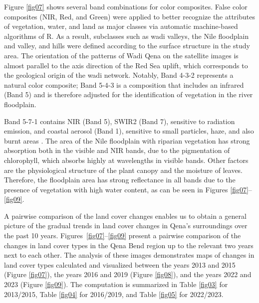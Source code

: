 \documentclass[information,article,accept,pdftex,moreauthors]{Definitions/mdpi}
\begin{document}
Figure \ref{fig07} shows several band combinations for color composites. False color composites (NIR, Red{, }and Green) {were }applied to better {recognize } the attributes of vegetation, water{, }and land as major classes via automatic machine-based algorithms of R. {As a result, } subclasses such as wadi valleys, the Nile floodplain and valley, {and hills }were defined according to the surface structure in the study area. {The } orientation of the patterns of Wadi Qena {on the satellite images is }almost parallel to the axis direction of the Red Sea uplift, which corresponds to the {geological} origin of the wadi network. {Notably}, Band 4-3-2 represents a natural color composite; Band 5-4-3 is a composition that includes an infrared (Band 5) and is therefore adjusted for the identification of vegetation in the river floodplain. 

Band 5-7-1 contains NIR (Band 5), SWIR2 (Band 7), sensitive to radiation emission, and coastal aerosol (Band 1), sensitive to small particles, haze, and also burnt areas \cite{8611806}. The area of the Nile floodplain with riparian vegetation has strong absorption both in the visible and NIR bands, due to the pigmentation of chlorophyll, which absorbs highly at wavelengths in visible bands. Other factors are the physiological structure of the plant canopy and the moisture of leaves. Therefore, the floodplain area has strong reflectance in all bands due to the presence of vegetation with high water content, as can be seen in Figures \ref{fig07}--\ref{fig09}.

A pairwise comparison of the land cover changes enables us to obtain a  general picture of the gradual trends in land cover changes in Qena's surroundings over the past 10 years. \mbox{Figures \ref{fig07}--\ref{fig09}} {present a pairwise comparison of the changes in land cover types in the Qena Bend region up to the relevant two years next to each other. The analysis of these images demonstrates maps of changes in land cover types calculated and visualized between the years 2013 and 2015 (Figure} \ref{fig07}), {the years 2016 and 2019 (Figure} \ref{fig08}), {and the years 2022 and 2023 (Figure} \ref{fig09}). {The computation is summarized in Table} \ref{fig03} {for 2013/2015, Table} \ref{fig04} {for 2016/2019, and Table} \ref{fig05} {for 2022/2023.} 
\end{document}
